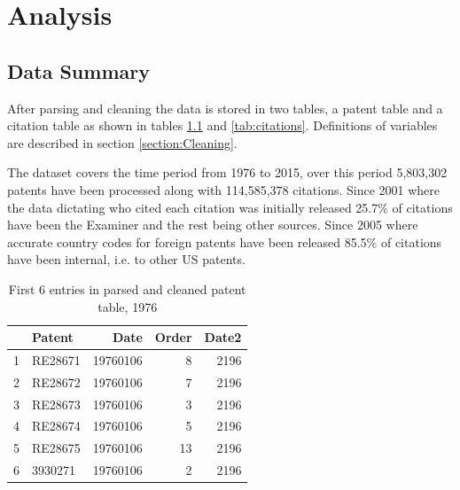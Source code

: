 \chapter{Analysis} %

\label{Chapter4} %

\section{Data Summary} \label{Data Summary}

After parsing and cleaning the data is stored in two tables, a patent table and a citation table as shown in tables \ref{tab:patents} and \ref{tab:citations}. Definitions of variables are described in section \ref{section:Cleaning}.

The dataset covers the time period from 1976 to 2015, over this period 5,803,302 patents have been processed along with 114,585,378 citations. Since 2001 where the data dictating who cited each citation was initially released 25.7\% of citations have been the Examiner and the rest being other sources. Since 2005 where accurate country codes for foreign patents have been released 85.5\% of citations have been internal, i.e. to other US patents.

\begin{table}[ht]
\caption{First 6 entries in parsed and cleaned patent table, 1976}
\label{tab:patents}
\centering
\begin{tabular}{rlrrr}
  \hline
 & Patent & Date & Order & Date2 \\ 
  \hline
  1 & RE28671 & 19760106 &   8 & 2196 \\ 
  2 & RE28672 & 19760106 &   7 & 2196 \\ 
  3 & RE28673 & 19760106 &   3 & 2196 \\ 
  4 & RE28674 & 19760106 &   5 & 2196 \\ 
  5 & RE28675 & 19760106 &  13 & 2196 \\ 
  6 & 3930271 & 19760106 &   2 & 2196 \\ 
   \hline
\end{tabular}
\end{table}

